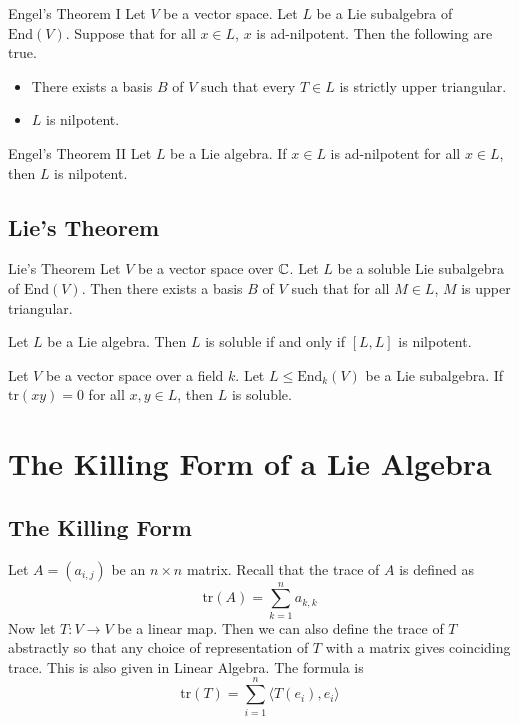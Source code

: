 \documentclass[a4paper]{article}
\begin{document}
\begin{thm}{Engel's Theorem I}{} Let $V$ be a vector space. Let $L$ be a Lie subalgebra of $\text{End}(V)$. Suppose that for all $x\in L$, $x$ is ad-nilpotent. Then the following are true. 
\begin{itemize}
\item There exists a basis $B$ of $V$ such that every $T\in L$ is strictly upper triangular. 
\item $L$ is nilpotent. 
\end{itemize}
\end{thm}

\begin{thm}{Engel's Theorem II}{} Let $L$ be a Lie algebra. If $x\in L$ is ad-nilpotent for all $x\in L$, then $L$ is nilpotent. 
\end{thm}

\subsection{Lie's Theorem}
\begin{thm}{Lie's Theorem}{} Let $V$ be a vector space over $\mathbb{C}$. Let $L$ be a soluble Lie subalgebra of $\text{End}(V)$. Then there exists a basis $B$ of $V$ such that for all $M\in L$, $M$ is upper triangular. 
\end{thm}

\begin{prp}{}{} Let $L$ be a Lie algebra. Then $L$ is soluble if and only if $[L,L]$ is nilpotent. 
\end{prp}

\begin{prp}{}{} Let $V$ be a vector space over a field $k$. Let $L\leq\text{End}_k(V)$ be a Lie subalgebra. If $\text{tr}(xy)=0$ for all $x,y\in L$, then $L$ is soluble. 
\end{prp}

\section{The Killing Form of a Lie Algebra}
\subsection{The Killing Form}
Let $A=(a_{i,j})$ be an $n\times n$ matrix. Recall that the trace of $A$ is defined as $$\text{tr}(A)=\sum_{k=1}^na_{k,k}$$ Now let $T:V\to V$ be a linear map. Then we can also define the trace of $T$ abstractly so that any choice of representation of $T$ with a matrix gives coinciding trace. This is also given in Linear Algebra. The formula is $$\text{tr}(T)=\sum_{i=1}^n\langle T(e_i),e_i\rangle$$
\end{document}
